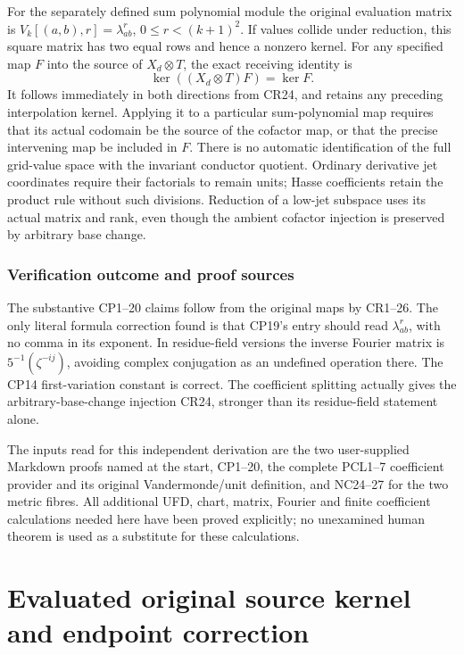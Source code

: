 For the separately defined sum polynomial module the original
evaluation matrix is
$V_k[(a,b),r]=\lambda_{ab}^{r}$, $0\le r<(k+1)^2$.
If values collide under reduction, this square matrix has two
equal rows and hence a nonzero kernel.  For any specified map
$F$ into the source of $X_d\otimes T$, the exact receiving
identity is
\[
 \ker((X_d\otimes T)F)=\ker F.                                \tag{CR26}
\]
It follows immediately in both directions from CR24, and retains
any preceding interpolation kernel.  Applying it to a particular
sum-polynomial map requires that its actual codomain be the
source of the cofactor map, or that the precise intervening map
be included in $F$.  There is no automatic identification of
the full grid-value space with the invariant conductor quotient.
Ordinary derivative jet coordinates require their factorials
to remain units; Hasse coefficients retain the product rule
without such divisions.  Reduction of a low-jet subspace uses
its actual matrix and rank, even though the ambient cofactor
injection is preserved by arbitrary base change.

\section{Verification outcome and proof sources}
The substantive CP1--20 claims follow from the original maps by
CR1--26.  The only literal formula correction found is that CP19's
entry should read $\lambda_{ab}^{r}$, with no comma in its exponent.
In residue-field versions the inverse Fourier matrix is
$5^{-1}(\zeta^{-ij})$, avoiding complex conjugation as an undefined
operation there.  The CP14 first-variation constant is correct.
The coefficient splitting actually gives the arbitrary-base-change
injection CR24, stronger than its residue-field statement alone.

The inputs read for this independent derivation are the two
user-supplied Markdown proofs named at the start, CP1--20,
the complete PCL1--7 coefficient provider and its original
Vandermonde/unit definition, and NC24--27 for the two metric
fibres.  All additional UFD, chart, matrix, Fourier and finite
coefficient calculations needed here have been proved explicitly;
no unexamined human theorem is used as a substitute for these
calculations.

\endgroup

\clearpage\begingroup
\part*{Evaluated original source kernel and endpoint correction}
\providecommand{\pkerneltightlist}{\setlength{\itemsep}{0pt}\setlength{\parskip}{0pt}}
\newcommand{\pkerneldiag}{\operatorname{diag}}
\newcommand{\pkernelrank}{\operatorname{rank}}
\newcommand{\pkernelTr}{\operatorname{Tr}}

